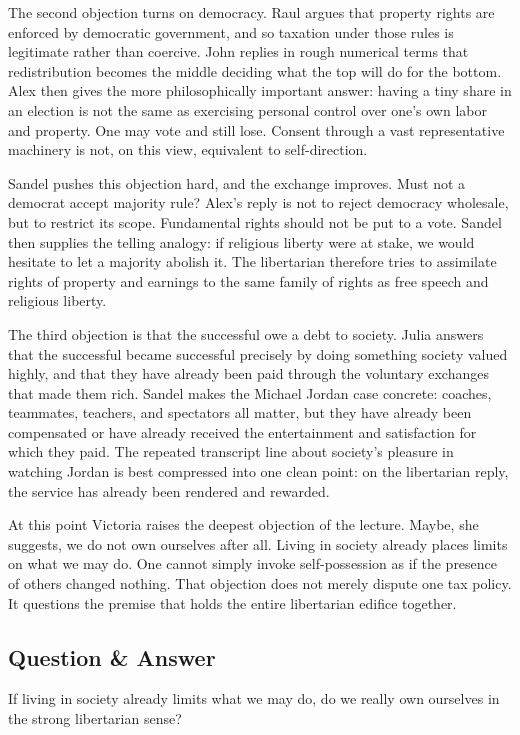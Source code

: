 The second objection turns on democracy. Raul argues that property rights are enforced by democratic government, and so taxation under those rules is legitimate rather than coercive. John replies in rough numerical terms that redistribution becomes the middle deciding what the top will do for the bottom. Alex then gives the more philosophically important answer: having a tiny share in an election is not the same as exercising personal control over one's own labor and property. One may vote and still lose. Consent through a vast representative machinery is not, on this view, equivalent to self-direction.

Sandel pushes this objection hard, and the exchange improves. Must not a democrat accept majority rule? Alex's reply is not to reject democracy wholesale, but to restrict its scope. Fundamental rights should not be put to a vote. Sandel then supplies the telling analogy: if religious liberty were at stake, we would hesitate to let a majority abolish it. The libertarian therefore tries to assimilate rights of property and earnings to the same family of rights as free speech and religious liberty.

The third objection is that the successful owe a debt to society. Julia answers that the successful became successful precisely by doing something society valued highly, and that they have already been paid through the voluntary exchanges that made them rich. Sandel makes the Michael Jordan case concrete: coaches, teammates, teachers, and spectators all matter, but they have already been compensated or have already received the entertainment and satisfaction for which they paid. The repeated transcript line about society's pleasure in watching Jordan is best compressed into one clean point: on the libertarian reply, the service has already been rendered and rewarded.

At this point Victoria raises the deepest objection of the lecture. Maybe, she suggests, we do not own ourselves after all. Living in society already places limits on what we may do. One cannot simply invoke self-possession as if the presence of others changed nothing. That objection does not merely dispute one tax policy. It questions the premise that holds the entire libertarian edifice together.

\subsection{Question \& Answer}

If living in society already limits what we may do, do we really own ourselves in the strong libertarian sense?

